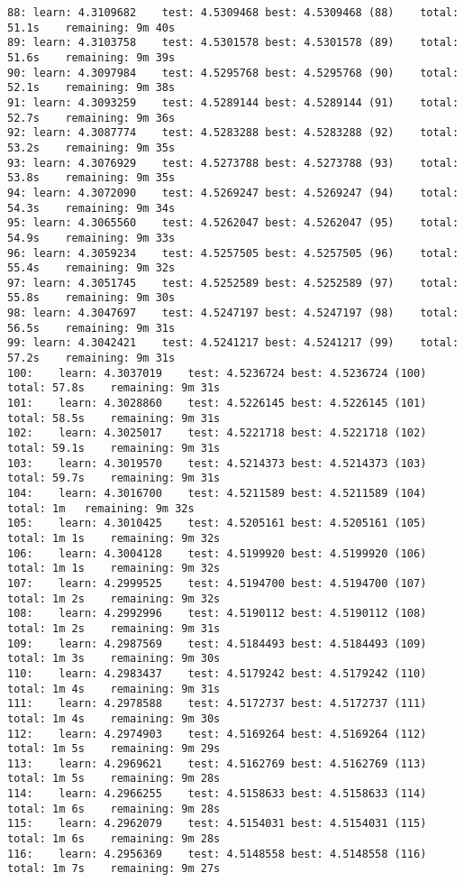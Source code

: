 \documentclass[11pt]{article}
\begin{document}
\begin{Verbatim}[commandchars=\\\{\}]
88:	learn: 4.3109682	test: 4.5309468	best: 4.5309468 (88)	total: 51.1s	remaining: 9m 40s
89:	learn: 4.3103758	test: 4.5301578	best: 4.5301578 (89)	total: 51.6s	remaining: 9m 39s
90:	learn: 4.3097984	test: 4.5295768	best: 4.5295768 (90)	total: 52.1s	remaining: 9m 38s
91:	learn: 4.3093259	test: 4.5289144	best: 4.5289144 (91)	total: 52.7s	remaining: 9m 36s
92:	learn: 4.3087774	test: 4.5283288	best: 4.5283288 (92)	total: 53.2s	remaining: 9m 35s
93:	learn: 4.3076929	test: 4.5273788	best: 4.5273788 (93)	total: 53.8s	remaining: 9m 35s
94:	learn: 4.3072090	test: 4.5269247	best: 4.5269247 (94)	total: 54.3s	remaining: 9m 34s
95:	learn: 4.3065560	test: 4.5262047	best: 4.5262047 (95)	total: 54.9s	remaining: 9m 33s
96:	learn: 4.3059234	test: 4.5257505	best: 4.5257505 (96)	total: 55.4s	remaining: 9m 32s
97:	learn: 4.3051745	test: 4.5252589	best: 4.5252589 (97)	total: 55.8s	remaining: 9m 30s
98:	learn: 4.3047697	test: 4.5247197	best: 4.5247197 (98)	total: 56.5s	remaining: 9m 31s
99:	learn: 4.3042421	test: 4.5241217	best: 4.5241217 (99)	total: 57.2s	remaining: 9m 31s
100:	learn: 4.3037019	test: 4.5236724	best: 4.5236724 (100)	total: 57.8s	remaining: 9m 31s
101:	learn: 4.3028860	test: 4.5226145	best: 4.5226145 (101)	total: 58.5s	remaining: 9m 31s
102:	learn: 4.3025017	test: 4.5221718	best: 4.5221718 (102)	total: 59.1s	remaining: 9m 31s
103:	learn: 4.3019570	test: 4.5214373	best: 4.5214373 (103)	total: 59.7s	remaining: 9m 31s
104:	learn: 4.3016700	test: 4.5211589	best: 4.5211589 (104)	total: 1m	remaining: 9m 32s
105:	learn: 4.3010425	test: 4.5205161	best: 4.5205161 (105)	total: 1m 1s	remaining: 9m 32s
106:	learn: 4.3004128	test: 4.5199920	best: 4.5199920 (106)	total: 1m 1s	remaining: 9m 32s
107:	learn: 4.2999525	test: 4.5194700	best: 4.5194700 (107)	total: 1m 2s	remaining: 9m 32s
108:	learn: 4.2992996	test: 4.5190112	best: 4.5190112 (108)	total: 1m 2s	remaining: 9m 31s
109:	learn: 4.2987569	test: 4.5184493	best: 4.5184493 (109)	total: 1m 3s	remaining: 9m 30s
110:	learn: 4.2983437	test: 4.5179242	best: 4.5179242 (110)	total: 1m 4s	remaining: 9m 31s
111:	learn: 4.2978588	test: 4.5172737	best: 4.5172737 (111)	total: 1m 4s	remaining: 9m 30s
112:	learn: 4.2974903	test: 4.5169264	best: 4.5169264 (112)	total: 1m 5s	remaining: 9m 29s
113:	learn: 4.2969621	test: 4.5162769	best: 4.5162769 (113)	total: 1m 5s	remaining: 9m 28s
114:	learn: 4.2966255	test: 4.5158633	best: 4.5158633 (114)	total: 1m 6s	remaining: 9m 28s
115:	learn: 4.2962079	test: 4.5154031	best: 4.5154031 (115)	total: 1m 6s	remaining: 9m 28s
116:	learn: 4.2956369	test: 4.5148558	best: 4.5148558 (116)	total: 1m 7s	remaining: 9m 27s

\end{Verbatim}
\end{document}
